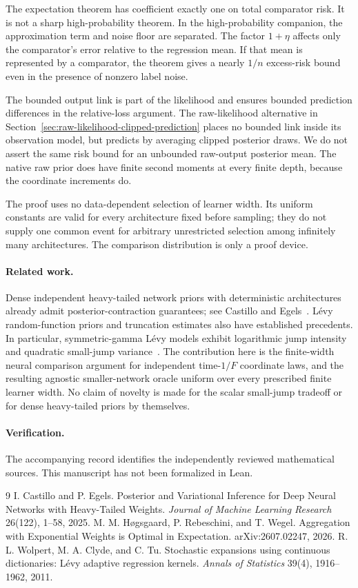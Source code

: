 \documentclass[11pt]{article}
\theoremstyle{remark}\newtheorem{remark}[theorem]{Remark}
\begin{document}
The expectation theorem has coefficient exactly one on total comparator risk. It is not a sharp high-probability theorem. In the high-probability companion, the approximation term and noise floor are separated. The factor $1+\eta$ affects only the comparator's error relative to the regression mean. If that mean is represented by a comparator, the theorem gives a nearly $1/n$ excess-risk bound even in the presence of nonzero label noise.

The bounded output link is part of the likelihood and ensures bounded prediction differences in the relative-loss argument. The raw-likelihood alternative in Section~\ref{sec:raw-likelihood-clipped-prediction} places no bounded link inside its observation model, but predicts by averaging clipped posterior draws. We do not assert the same risk bound for an unbounded raw-output posterior mean. The native raw prior does have finite second moments at every finite depth, because the coordinate increments do.

The proof uses no data-dependent selection of learner width. Its uniform constants are valid for every architecture fixed before sampling; they do not supply one common event for arbitrary unrestricted selection among infinitely many architectures. The comparison distribution is only a proof device.

\paragraph{Related work.}
Dense independent heavy-tailed network priors with deterministic architectures already admit posterior-contraction guarantees; see Castillo and Egels~\cite{castillo-egels}. L\'evy random-function priors and truncation estimates also have established precedents. In particular, symmetric-gamma L\'evy models exhibit logarithmic jump intensity and quadratic small-jump variance~\cite{wolpert}. The contribution here is the finite-width neural comparison argument for independent time-$1/F$ coordinate laws, and the resulting agnostic smaller-network oracle uniform over every prescribed finite learner width. No claim of novelty is made for the scalar small-jump tradeoff or for dense heavy-tailed priors by themselves.

\paragraph{Verification.}
The accompanying record identifies the independently reviewed mathematical sources. This manuscript has not been formalized in Lean.
\begin{thebibliography}{9}
 I. Castillo and P. Egels. Posterior and Variational Inference for Deep Neural Networks with Heavy-Tailed Weights. \emph{Journal of Machine Learning Research} 26(122), 1--58, 2025.
 M. M. H\o gsgaard, P. Rebeschini, and T. Wegel. Aggregation with Exponential Weights is Optimal in Expectation. arXiv:2607.02247, 2026.
 R. L. Wolpert, M. A. Clyde, and C. Tu. Stochastic expansions using continuous dictionaries: L\'evy adaptive regression kernels. \emph{Annals of Statistics} 39(4), 1916--1962, 2011.
\end{thebibliography}
\end{document}
